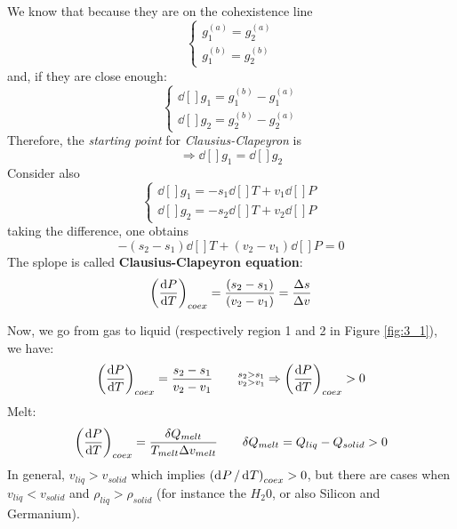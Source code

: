 \documentclass[../main/main.tex]{subfiles}
\begin{document}
\noindent We know that because they are on the cohexistence line
\begin{equation}
  \begin{cases}
   g_1^{(a)} = g_2^{(a)}\\
   g_1^{(b)} = g_2^{(b)}
  \end{cases}
\label{eq:}
\end{equation}
and, if they are close enough:
\begin{equation}
  \begin{cases}
  \dd[]{g_1} = g_1^{(b)} - g_1^{(a)} \\
  \dd[]{g_2} = g_2^{(b)} - g_2^{(a)}
  \end{cases}
\label{eq:}
\end{equation}
Therefore, the \emph{starting point} for \emph{Clausius-Clapeyron} is
\begin{equation}
  \Rightarrow \dd[]{g_1} =\dd[]{g_2}
  \label{eq:}
\end{equation}
Consider also
\begin{equation}
  \begin{cases}
   \dd[]{g_1} = -s_1 \dd[]{T} + v_1 \dd[]{P}   \\
   \dd[]{g_2} = -s_2 \dd[]{T} + v_2 \dd[]{P}
  \end{cases}
\label{eq:}
\end{equation}
taking the difference, one obtains
\begin{equation}
  -(s_2 - s_1) \dd[]{T} + (v_2 - v_1) \dd[]{P} = 0
  \label{eq:}
\end{equation}
The splope is called \textbf{Clausius-Clapeyron equation}:
\begin{equation}
  \qty(\dv{P}{T} )_{coex} = \frac{(s_2-s_1)}{(v_2-v_1)} = \frac{\Delta s}{\Delta v}
  \label{eq:}
\end{equation}

 Now, we go from gas to liquid (respectively region 1 and 2 in Figure \ref{fig:3_1}), we have:
\begin{equation}
  \qty(\dv{P}{T} )_{coex} = \frac{s_2 - s_1}{v_2 - v_1} \qquad \substack{ s_2 > s_1 \\ v_2 > v_1} \Rightarrow \qty(\dv{P}{T} )_{coex} > 0
  \label{eq:}
\end{equation}
Melt:
\begin{equation}
  \qty(\dv{P}{T} )_{coex} = \frac{\delta Q_{melt}}{T_{melt}\Delta v_{melt}} \qquad \delta Q_{melt} = Q_{liq} - Q_{solid} > 0
  \label{eq:}
\end{equation}
In general, \( v_{liq} > v_{solid} \) which implies \( \qty( \dd[]{P}/\dd[]{T}   )_{coex} > 0  \), but there are cases when \( v_{liq} < v_{solid} \) and \( \rho_{liq} > \rho _{solid} \) (for instance the \( H_2 0 \), or also Silicon and Germanium).
\end{document}
